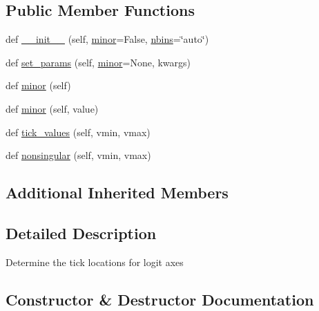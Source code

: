 \subsection*{Public Member Functions}
\begin{DoxyCompactItemize}
\item 
def \hyperlink{classmatplotlib_1_1ticker_1_1LogitLocator_a827fac49eb5753ea81d7a3e86f8ad5f8}{\+\_\+\+\_\+init\+\_\+\+\_\+} (self, \hyperlink{classmatplotlib_1_1ticker_1_1LogitLocator_a2c28a8952a6a118529210a24cc4db54e}{minor}=False, \hyperlink{classmatplotlib_1_1ticker_1_1MaxNLocator_ab982e8cceb9cdf89f9ca4166729401f1}{nbins}=\char`\"{}auto\char`\"{})
\item 
def \hyperlink{classmatplotlib_1_1ticker_1_1LogitLocator_abf5cc3744139d807f58ec3ad900cf973}{set\+\_\+params} (self, \hyperlink{classmatplotlib_1_1ticker_1_1LogitLocator_a2c28a8952a6a118529210a24cc4db54e}{minor}=None, kwargs)
\item 
def \hyperlink{classmatplotlib_1_1ticker_1_1LogitLocator_a2c28a8952a6a118529210a24cc4db54e}{minor} (self)
\item 
def \hyperlink{classmatplotlib_1_1ticker_1_1LogitLocator_a33c0858b733e62bc5239318c37c0d153}{minor} (self, value)
\item 
def \hyperlink{classmatplotlib_1_1ticker_1_1LogitLocator_a23b468d98b7e6b2e281363576bf8896d}{tick\+\_\+values} (self, vmin, vmax)
\item 
def \hyperlink{classmatplotlib_1_1ticker_1_1LogitLocator_a00ffe7955d1577c584bd176d8d879e3f}{nonsingular} (self, vmin, vmax)
\end{DoxyCompactItemize}
\subsection*{Additional Inherited Members}


\subsection{Detailed Description}
\begin{DoxyVerb}Determine the tick locations for logit axes
\end{DoxyVerb}
 

\subsection{Constructor \& Destructor Documentation}
\mbox{\label{classmatplotlib_1_1ticker_1_1LogitLocator_a827fac49eb5753ea81d7a3e86f8ad5f8}} 
